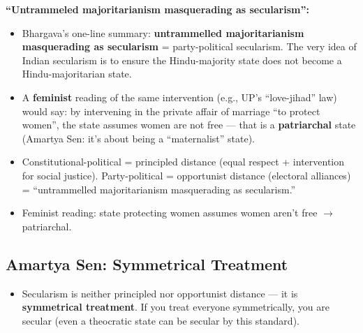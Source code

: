 \begin{CriticalPoint}
\textbf{``Untrammeled majoritarianism masquerading as secularism'':}
\begin{itemize}
\item Bhargava's one-line summary: \textbf{untrammelled majoritarianism masquerading as secularism} = party-political secularism. The very idea of Indian secularism is to ensure the Hindu-majority state does not become a Hindu-majoritarian state.
\item A \textbf{feminist} reading of the same intervention (e.g., UP's ``love-jihad'' law) would say: by intervening in the private affair of marriage ``to protect women'', the state assumes women are not free --- that is a \textbf{patriarchal} state (Amartya Sen: it's about being a ``maternalist'' state).
\end{itemize}
\end{CriticalPoint}

\begin{QuickRevision}
\begin{itemize}
\item Constitutional-political = principled distance (equal respect + intervention for social justice). Party-political = opportunist distance (electoral alliances) = ``untrammelled majoritarianism masquerading as secularism.''
\item Feminist reading: state protecting women assumes women aren't free $\rightarrow$ patriarchal.
\end{itemize}
\end{QuickRevision}

\sectiondivider

\subsection{Amartya Sen: Symmetrical Treatment}

\begin{KeyConcept}
\begin{itemize}
\item Secularism is neither principled nor opportunist distance --- it is \textbf{symmetrical treatment}. If you treat everyone symmetrically, you are secular (even a theocratic state can be secular by this standard).
\end{itemize}
\end{KeyConcept}


